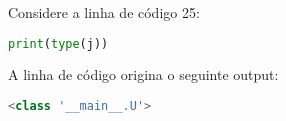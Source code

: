 \documentclass[12pt,varwidth=16cm,border=17pt]{standalone}
\begin{document}
Considere a linha de código 25:

\begin{lstlisting}[language=Python]
print(type(j))
\end{lstlisting}

A linha de código origina o seguinte output:

\begin{lstlisting}[language=Python]
<class '__main__.U'>
\end{lstlisting}
\end{document}
